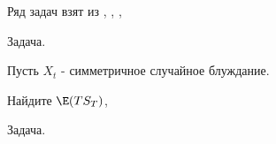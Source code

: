 {%

















Ряд задач взят из \cite{stirzaker:prp}, \cite{stirzaker:otep}, \cite{zastawniak:bsp}, \cite{blom:pspt}


Задача. 


Пусть $X_{t}$ - симметричное случайное блуждание.

Найдите $\E(TS_{T})$,

Задача. \cite{wilmott:chap} %

}
